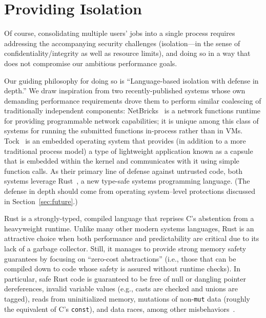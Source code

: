 \section{Providing Isolation}
\label{sec:isolation}

Of course, consolidating multiple users' jobs into a single process requires
addressing the accompanying security challenges (isolation---in the sense of
confidentiality/integrity as well as resource limits), and doing so in a way that
does not compromise our ambitious performance goals.

Our guiding philosophy for doing so is ``Language-based isolation with defense in depth.''
We draw inspiration from two recently-published systems whose own demanding
performance requirements drove them to perform similar coalescing of traditionally
independent components:  NetBricks~\cite{Panda2016} is a network functions runtime
for providing programmable network capabilities; it is unique among this class of
systems for running the submitted functions in-process rather than in VMs.
Tock~\cite{Levy2017} is an embedded operating system that provides (in addition to a
more traditional process model) a type of lightweight application known as a capsule
that is embedded within the kernel and communicates with it using simple function
calls.  As their primary line of defense against untrusted code, both systems
leverage Rust~\cite{www-rustlang}, a new type-safe systems programming language.
(The defense in depth should come from operating system--level protections discussed
in Section~\ref{sec:future}.)

Rust is a strongly-typed, compiled language that reprises C's abstention from a
heavyweight runtime.  Unlike many other modern systems languages, Rust is an
attractive choice when both performance and predictability are critical due to its
lack of a garbage collector.  Still, it manages to provide strong memory safety
guarantees by focusing on ``zero-cost abstractions'' (i.e., those that can be
compiled down to code whose safety is assured without runtime checks).  In
particular, safe Rust code is guaranteed to be free of null or dangling pointer
dereferences, invalid variable values (e.g., casts are checked and unions are
tagged), reads from uninitialized memory, mutations of non-\texttt{mut} data (roughly
the equivalent of C's \texttt{const}), and data races, among other
misbehaviors~\cite{www-rustlang-ub}.

